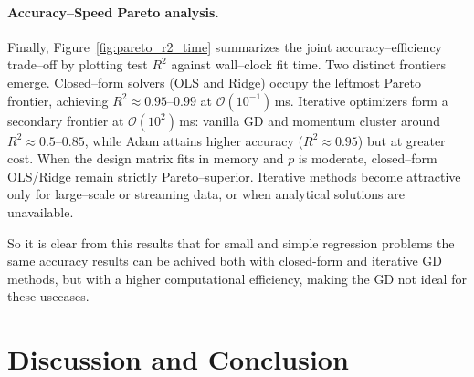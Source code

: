 \documentclass[
 reprint,            %
 amsmath,amssymb,
 aps,
]{revtex4-2}
\begin{document}
\paragraph*{Accuracy–Speed Pareto analysis.}
Finally, Figure~\ref{fig:pareto_r2_time} summarizes the joint accuracy–efficiency trade–off by plotting test $R^2$ against wall–clock fit time. 
Two distinct frontiers emerge\cite{bottou2010largeScaleSGD}.
Closed–form solvers (OLS and Ridge) occupy the leftmost Pareto frontier, achieving $R^2\approx0.95$–$0.99$ at $\mathcal{O}(10^{-1})$\,ms.  
Iterative optimizers form a secondary frontier at $\mathcal{O}(10^2)$\,ms: vanilla GD and momentum cluster around $R^2\approx0.5$–$0.85$, while Adam attains higher accuracy ($R^2\approx0.95$) but at greater cost. 
When the design matrix fits in memory and $p$ is moderate, closed–form OLS/Ridge remain strictly Pareto–superior. 
Iterative methods become attractive only for large–scale or streaming data, or when analytical solutions are unavailable.
% 


So it is clear from this results that for small and simple regression problems the same accuracy results can be achived both with closed-form and iterative GD methods, but with a higher computational efficiency, making the GD not ideal for these usecases.

\section{Discussion and Conclusion}
\end{document}

